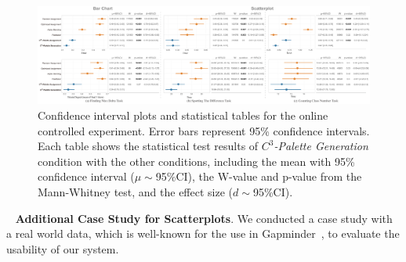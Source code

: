 \documentclass[review,onecolumn]{vgtc}                %
\newcommand{\myparagraph}[1]{\mbox{\ } \newline \noindent \textbf{#1}}
\renewcommand{\paragraph}[1]{\myparagraph{#1}}
\begin{document}
\begin{figure}[h]
\centering
\includegraphics[width=1\linewidth]{formal-statistics-results.pdf}
\caption{Confidence interval plots and statistical tables for the online controlled experiment. Error bars represent 95\% confidence intervals. Each table shows the statistical test results of \emph{$C^3$-Palette Generation} condition with the other conditions, including the mean with 95\% confidence interval ($\mu\sim$95\%CI), the W-value and p-value from the Mann-Whitney test, and the effect size ($d\sim$95\%CI).
}
\vspace*{-5mm}
\label{fig:formalStudy}
\end{figure}


\paragraph{Additional Case Study for Scatterplots}.
We conducted a case study with a real world data, which is well-known for the use in Gapminder~\cite{gapminder}, to evaluate the usability of our system.
\end{document}
